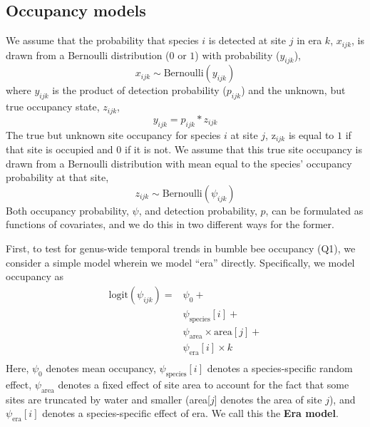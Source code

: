 \documentclass[12pt]{article}
\begin{document}
\subsection{Occupancy models}
We assume that the probability that species $i$ is detected at site $j$ in era $k$, $x_{ijk}$, is drawn from a Bernoulli distribution ($0$ or $1$) with probability ($y_{ijk}$),
\begin{equation}
    \label{eq: x}
    x_{ijk} \sim \text{Bernoulli} (y_{ijk})
\end{equation}
where $y_{ijk}$ is the product of detection probability ($p_{ijk}$) and the unknown, but true occupancy state, $z_{ijk}$, 
\begin{equation}
    \label{eq:y}
    y_{ijk} = p_{ijk}  * z_{ijk}
\end{equation}
The true but unknown site occupancy for species $i$ at site $j$, z$_{ijk}$ is equal to $1$ if that site is occupied and $0$ if it is not. We assume that this true site occupancy is drawn from a Bernoulli distribution with mean equal to the species' occupancy probability at that site, 
\begin{equation}
    \label{eq: z}
    z_{ijk} \sim \text{Bernoulli} (\psi_{ijk})
\end{equation}
Both occupancy probability, $\psi$, and detection probability, $p$, can be formulated as functions of covariates, and we do this in two different ways for the former.

First, to test for genus-wide temporal trends in bumble bee occupancy (Q1), we consider a simple model wherein we model ``era'' directly. Specifically, we model occupancy as
\begin{equation}
\label{eq:logit-occ-era}
\begin{split}    
\text{logit}(\psi_{ijk}) =& \psi_0 + \\ 
&\psi_{\mathrm{species}}[i] + \\
&\psi_{\mathrm{area}} \times \mathrm{area}[j] + \\
&\psi_{\mathrm{era}}[i] \times k\\ 
\end{split}
\end{equation}
Here, $\psi_0$ denotes mean occupancy, $\psi_{\mathrm{species}}[i]$ denotes a species-specific random effect, $\psi_{\mathrm{area}}$ denotes a fixed effect of site area to account for the fact that some sites are truncated by water and smaller (area[$j$] denotes the area of site $j$), and $\psi_{\mathrm{era}}[i]$ denotes a species-specific effect of era. We call this the \textbf{Era model}. 
\end{document}
